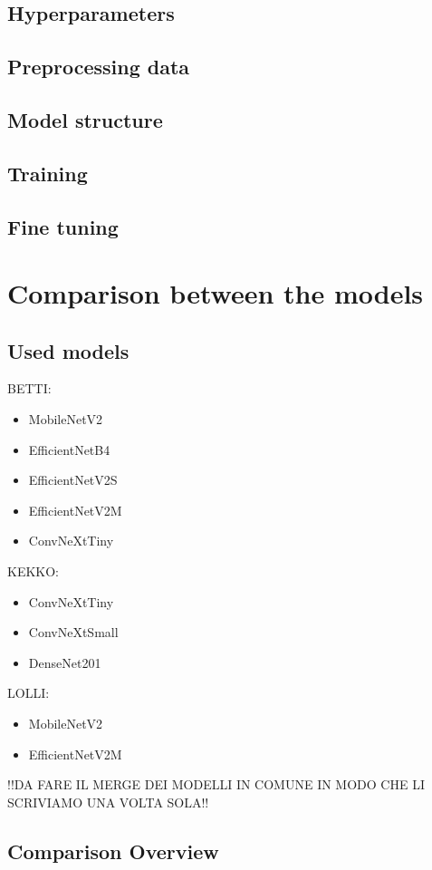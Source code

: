 \documentclass{article}
\begin{document}
\subsection{Hyperparameters}
\subsection{Preprocessing data}
\subsection{Model structure}
\subsection{Training}
\subsection{Fine tuning}

\section{Comparison between the models}
\subsection{Used models}
BETTI:
\begin{itemize}
    \item MobileNetV2
    \item EfficientNetB4
    \item EfficientNetV2S
    \item EfficientNetV2M
    \item ConvNeXtTiny
\end{itemize}
KEKKO:
\begin{itemize}
    \item ConvNeXtTiny
    \item ConvNeXtSmall
    \item DenseNet201
\end{itemize}
LOLLI:
\begin{itemize}
    \item MobileNetV2
    \item EfficientNetV2M
\end{itemize}
!!DA FARE IL MERGE DEI MODELLI IN COMUNE IN MODO CHE LI SCRIVIAMO UNA VOLTA SOLA!!
\subsection{Comparison Overview}
\end{document}
